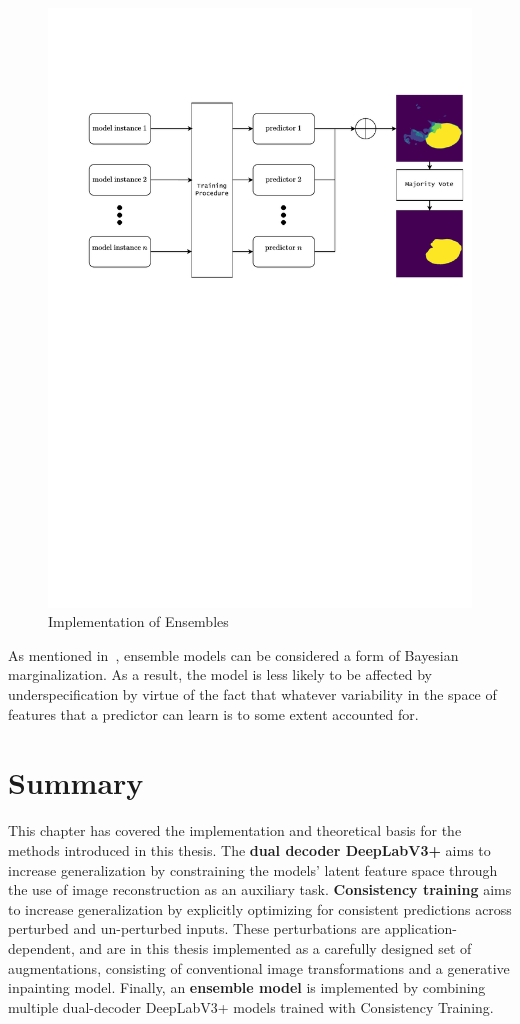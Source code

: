 \begin{figure}[htb]
    \centering
    \includegraphics[trim=1.5cm 16cm 0cm 4cm, clip, width=\linewidth]{illustrations/ensemble_config.pdf}
    \caption{Implementation of Ensembles}
    \label{fig:ensemble_setup}
\end{figure}

As mentioned in~, ensemble models can be considered a form of Bayesian marginalization. As a result, the model is less likely to be affected by underspecification by virtue of the fact that whatever variability in the space of features that a predictor can learn is to some extent accounted for.  

\section{Summary}
This chapter has covered the implementation and theoretical basis for the methods introduced in this thesis. The \textbf{dual decoder DeepLabV3+} aims to increase generalization by constraining the models' latent feature space through the use of image reconstruction as an auxiliary task. \textbf{Consistency training} aims to increase generalization by explicitly optimizing for consistent predictions across perturbed and un-perturbed inputs. These perturbations are application-dependent, and are in this thesis implemented as a carefully designed set of augmentations, consisting of conventional image transformations and a generative inpainting model. Finally, an \textbf{ensemble model} is implemented by combining multiple dual-decoder DeepLabV3+ models trained with Consistency Training. 